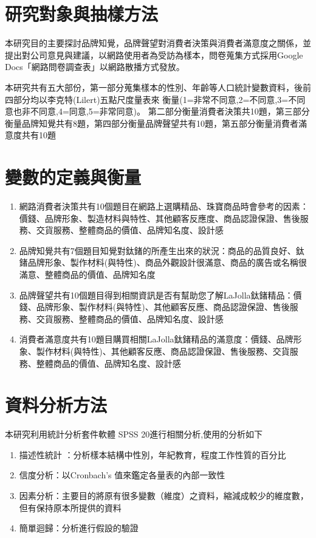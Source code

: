 \section{研究對象與抽樣方法}
本研究目的主要探討品牌知覺，品牌聲望對消費者決策與消費者滿意度之關係，並提出對公司意見與建議，以網路使用者為受訪為樣本，問卷蒐集方式採用Google Docs「網路問卷調查表」以網路散播方式發放。

本研究共有五大部份，第一部分蒐集樣本的性別、年齡等人口統計變數資料，後前四部分均以李克特(Lilert)五點尺度量表來 衡量(1=非常不同意,2=不同意,3=不同意也非不同意,4=同意,5=非常同意)。
第二部分衡量消費者決策共10題，第三部分衡量品牌知覺共有8題，第四部分衡量品牌聲望共有10題，第五部分衡量消費者滿意度共有10題

\section{變數的定義與衡量}
\begin{enumerate}
\item  網路消費者決策共有10個題目在網路上選購精品、珠寶商品時會參考的因素：價錢、品牌形象、製造材料與特性、其他顧客反應度、商品認證保證、售後服務、交貨服務、整體商品的價值、品牌知名度、設計感
\item 品牌知覺共有7個題目知覺對鈦鍺的所產生出來的狀況：商品的品質良好、鈦鍺品牌形象、製作材料(與特性)、商品外觀設計很滿意、商品的廣告或名稱很滿意、整體商品的價值、品牌知名度
\item 品牌聲望共有10個題目得到相關資訊是否有幫助您了解LaJolla鈦鍺精品：價錢、品牌形象、製作材料(與特性)、其他顧客反應、商品認證保證、售後服務、交貨服務、整體商品的價值、品牌知名度、設計感
\item 消費者滿意度共有10題目購買相關LaJolla鈦鍺精品的滿意度：價錢、品牌形象、製作材料(與特性)、其他顧客反應、商品認證保證、售後服務、交貨服務、整體商品的價值、品牌知名度、設計感
\end{enumerate}

\section{資料分析方法}
本研究利用統計分析套件軟體 SPSS 20進行相關分析,使用的分析如下
\begin{enumerate}
\item 描述性統計 ：分析樣本結構中性別，年紀教育，程度工作性質的百分比
\item 信度分析：以Cronbach's 值來鑑定各量表的內部一致性
\item 因素分析：主要目的將原有很多變數（維度）之資料，縮減成較少的維度數，但有保持原本所提供的資料
\item 簡單迴歸：分析進行假設的驗證
\end{enumerate}

